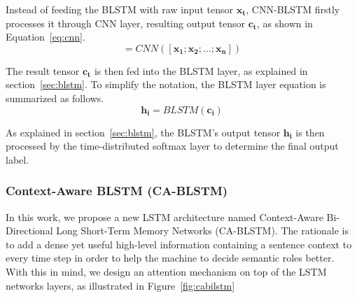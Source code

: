 Instead of feeding the BLSTM with raw input tensor $\mathbf{x_{t}}$, CNN-BLSTM firstly processes it through CNN layer, resulting output tensor $\mathbf{c_{t}}$, as shown in Equation~\ref{eq:cnn}.
\begin{equation}
[\mathbf{c_{1}}; \mathbf{c_{2}}; ...; \mathbf{c_{n}}] = CNN([\mathbf{x_{1}}; \mathbf{x_{2}}; ...; \mathbf{x_{n}}])
\end{equation}

The result tensor $\mathbf{c_{t}}$ is then fed into the BLSTM layer, as explained in section~\ref{sec:blstm}. To simplify the notation, the BLSTM layer equation is summarized as follows.
\begin{equation}
\mathbf{h_{i}} = BLSTM(\mathbf{c_{i}})
\end{equation}

As explained in section~\ref{sec:blstm}, the BLSTM's output tensor $\mathbf{h_{i}}$ is then processed by the time-distributed softmax layer to determine the final output label.

\subsubsection{Context-Aware BLSTM (CA-BLSTM)}
In this work, we propose a new LSTM architecture named Context-Aware Bi-Directional Long Short-Term Memory Networks (CA-BLSTM). The rationale is to add a dense yet useful high-level information containing a sentence context to every time step in order to help the machine to decide semantic roles better. With this in mind, we design an attention mechanism on top of the LSTM networks layers, as illustrated in Figure~\ref{fig:cabilstm} 

